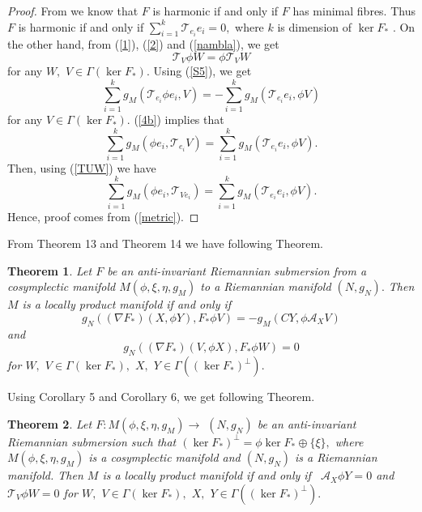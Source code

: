 \documentclass{amsart}
\newtheorem{theorem}{Theorem}
\theoremstyle{plain}
\numberwithin{equation}{section}
\begin{document}
\begin{proof}
From \cite{EJ} we know that $F$ is harmonic if and only if $F$ has minimal
fibres. Thus $F$ is harmonic if and only if $\sum\limits_{i=1}^{k}\mathcal{T}_{e_{i}}e_{i}=0,$ where $k$ is dimension of $\ker F_{\ast }$ . On the other
hand, from (\ref{1}), (\ref{2}) and (\ref{nambla}), we get\begin{equation}
\mathcal{T}_{V}\phi W=\phi \mathcal{T}_{V}W  \label{S5}
\end{equation}for any $W,$ $V\in \Gamma (\ker F_{\ast }).$ Using (\ref{S5}), we get 
\begin{equation*}
\sum\limits_{i=1}^{k}g_{M}(\mathcal{T}_{e_{i}}\phi
e_{i},V)=-\sum\limits_{i=1}^{k}g_{M}(\mathcal{T}_{e_{i}}e_{i},\phi V)
\end{equation*}for any $V\in \Gamma (\ker F_{\ast }).$ (\ref{4b}) implies that\begin{equation*}
\sum\limits_{i=1}^{k}g_{M}(\phi e_{i},\mathcal{T}_{e_{i}}V)=\sum\limits_{i=1}^{k}g_{M}(\mathcal{T}_{e_{i}}e_{i},\phi V).
\end{equation*}Then, using (\ref{TUW}) we have\begin{equation*}
\sum\limits_{i=1}^{k}g_{M}(\phi e_{i},\mathcal{T}_{Ve_{i}})=\sum\limits_{i=1}^{k}g_{M}(\mathcal{T}_{e_{i}}e_{i},\phi V).
\end{equation*}Hence, proof comes from (\ref{metric}).
\end{proof}

From Theorem 13 and Theorem 14 we have following Theorem.

\begin{theorem}
Let $F$ be an anti-invariant Riemannian submersion from a cosymplectic
manifold $M(\phi ,\xi ,\eta ,g_{M})$ to a Riemannian manifold $(N,g_{N}).$
Then $M$ is a locally product manifold if and only if\begin{equation*}
g_{N}((\nabla F_{\ast })(X,\phi Y),F_{\ast }\phi V)=-g_{M}(CY,\phi \mathcal{A}_{X}V)
\end{equation*}and\begin{equation*}
g_{N}((\nabla F_{\ast })(V,\phi X),F_{\ast }\phi W)=0
\end{equation*}for $W,$ $V\in \Gamma (\ker F_{\ast }),$ $X,$ $Y\in \Gamma ((\ker F_{\ast
})^{\bot }).$
\end{theorem}

Using Corollary 5 and Corollary 6, we get following Theorem.

\begin{theorem}
Let $F:M(\phi ,\xi ,\eta ,g_{M})\rightarrow $ $(N,g_{N})$ be an
anti-invariant Riemannian submersion such that $(\ker F_{\ast })^{\bot
}=\phi \ker F_{\ast }\oplus \{\xi \},$ where $M(\phi ,\xi ,\eta ,g_{M})$ is
a cosymplectic manifold and $(N,g_{N})$ is a Riemannian manifold. Then $M$
is a locally product manifold if and only if \ $\mathcal{A}_{X}\phi Y=0$ and 
$\mathcal{T}_{V}\phi W=0$ for $W,$ $V\in \Gamma (\ker F_{\ast }),$ $X,$ $Y\in \Gamma ((\ker F_{\ast })^{\bot }).$
\end{theorem}
\end{document}
